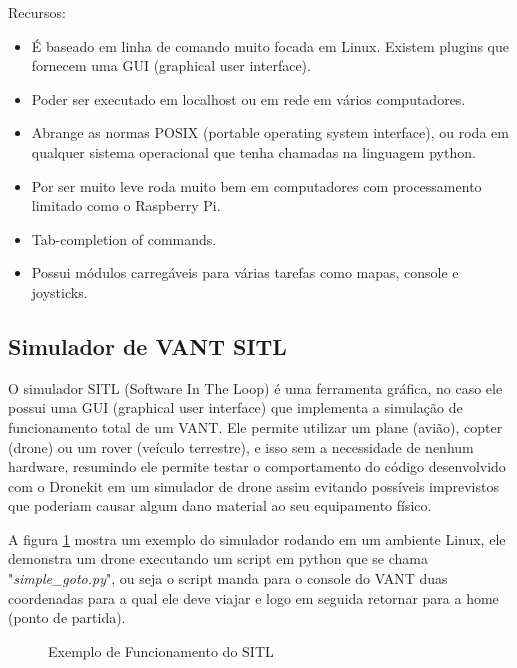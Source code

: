 Recursos:
\begin{itemize}
	\item É baseado em linha de comando muito focada em Linux. Existem plugins que fornecem uma GUI (graphical user interface).
	\item Poder ser executado em localhost ou em rede em vários computadores.
	\item Abrange as normas POSIX (portable operating system interface), ou roda em qualquer sistema operacional que tenha chamadas na linguagem python.
	\item Por ser muito leve roda muito bem em computadores com processamento limitado como o Raspberry Pi.
	\item Tab-completion of commands.
	\item Possui módulos carregáveis para várias tarefas como mapas, console e joysticks.
\end{itemize}

\subsection{Simulador de VANT SITL}
O simulador SITL (Software In The Loop) é uma ferramenta gráfica, no caso ele possui uma GUI (graphical user interface) que implementa a simulação de funcionamento total de um VANT. Ele permite utilizar um plane (avião), copter (drone) ou um rover (veículo terrestre), e isso sem a necessidade de nenhum hardware, resumindo ele permite testar o comportamento do código desenvolvido com o Dronekit em um simulador de drone assim evitando possíveis imprevistos que poderiam causar algum dano material ao seu equipamento físico. 

A figura \ref{fig:sitl} mostra um exemplo do simulador rodando em um ambiente Linux, ele demonstra um drone executando um script em python que se chama "\textit{simple\_goto.py}", ou seja o script manda para o console do VANT duas coordenadas para a qual ele deve viajar e logo em seguida retornar para a home (ponto de partida).

%
\begin{figure}[H]
	\centering
	\caption{Exemplo de Funcionamento do SITL}
	\fontsize{9pt}{12pt}\selectfont
	\def\svgwidth{15cm}
	
	\label{fig:sitl}
\end{figure}

